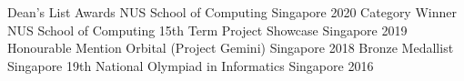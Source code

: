 



\begin{cvhonors}
  \cvhonor
  {Dean's List Awards} %
  {NUS School of Computing} %
  {Singapore} %
  {2020} %
  \cvhonor
  {Category Winner} %
  {NUS School of Computing 15th Term Project Showcase} %
  {Singapore} %
  {2019} %
  \cvhonor
  {Honourable Mention} %
  {Orbital (Project Gemini)} %
  {Singapore} %
  {2018} %
  \cvhonor
  {Bronze Medallist} %
  {Singapore 19th National Olympiad in Informatics} %
  {Singapore} %
  {2016} %




\end{cvhonors}
